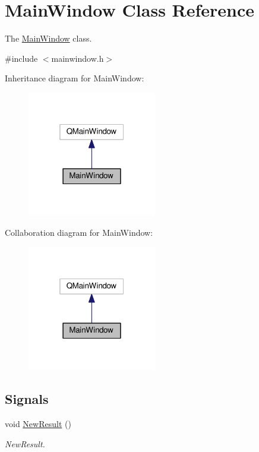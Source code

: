 \hypertarget{class_main_window}{}\section{Main\+Window Class Reference}
\label{class_main_window}


The \hyperlink{class_main_window}{Main\+Window} class.  




{\ttfamily \#include $<$mainwindow.\+h$>$}



Inheritance diagram for Main\+Window\+:
\nopagebreak
\begin{figure}[H]
\begin{center}
\leavevmode
\includegraphics[width=160pt]{class_main_window__inherit__graph}
\end{center}
\end{figure}


Collaboration diagram for Main\+Window\+:
\nopagebreak
\begin{figure}[H]
\begin{center}
\leavevmode
\includegraphics[width=160pt]{class_main_window__coll__graph}
\end{center}
\end{figure}
\subsection*{Signals}
\begin{DoxyCompactItemize}
\item 
void \hyperlink{class_main_window_af1c023e4354a163ebd130aa55aad2583}{New\+Result} ()\hypertarget{class_main_window_af1c023e4354a163ebd130aa55aad2583}{}\label{class_main_window_af1c023e4354a163ebd130aa55aad2583}

\begin{DoxyCompactList}\small\item\em New\+Result. \end{DoxyCompactList}\end{DoxyCompactItemize}
